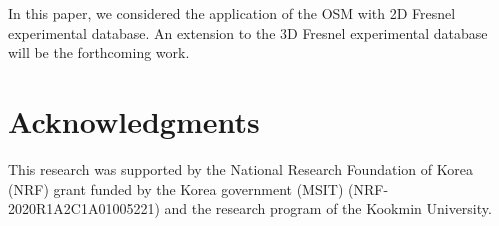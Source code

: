 \documentclass[3p,10pt]{elsarticle}
\theoremstyle{plain}
\theoremstyle{remark}
\begin{document}
In this paper, we considered the application of the OSM with 2D Fresnel experimental database. An extension to the 3D Fresnel experimental database \cite{GSE} will be the forthcoming work.

\section*{Acknowledgments}
This research was supported by the National Research Foundation of Korea (NRF) grant funded by the Korea government (MSIT) (NRF-2020R1A2C1A01005221) and the research program of the Kookmin University.




\end{document}
